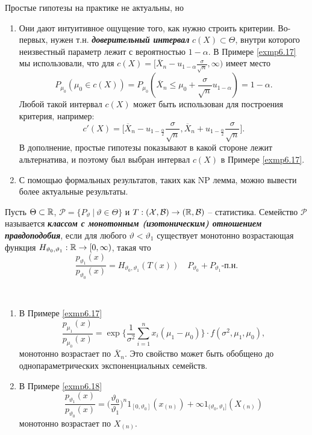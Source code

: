 \begin{rmrk}
	Простые гипотезы на практике не актуальны, но
	\begin{enumerate}
		\item Они дают интуитивное ощущение того, как нужно строить критерии. Во-первых, нужен т.н. \textbf{\textit{доверительный интервал}} $c(X) \subset \Theta$, внутри которого неизвестный параметр лежит с вероятностью $1-\alpha$. В Примере \ref{exmp6.17} мы использовали, что для $c(X)=[\overline{X}_n -u_{1 - \alpha} \frac{\sigma}{\sqrt{n}}, \infty)$ имеет место
		\[P_{\mu_0}(\mu_0 \in c(X)) = P_{\mu_0}(\overline{X}_n \leq \mu_0 + \frac{\sigma}{\sqrt{n}} u_{1-\alpha}) = 1-\alpha. \]
		Любой такой интервал  $c(X)$ может быть использован для построения критерия, например:
		\[c'(X) =\Big[\overline{X}_n -u_{1-\frac{\alpha}{2}} \frac{\sigma}{\sqrt{n}}, \overline{X}_n + u_{1-\frac{\alpha}{2}} \frac{\sigma}{\sqrt{n}} \Big].\]
		В дополнение, простые гипотезы показывают в какой стороне лежит альтернатива, и поэтому был выбран интервал $c(X)$ в Примере \ref{exmp6.17}.
		\item С помощью формальных результатов, таких как NP лемма, можно вывести более актуальные результаты.
	\end{enumerate}
\end{rmrk}

\begin{defn}
	Пусть $\Theta \subset \mathbb{R}$, $\mathcal{P} = \{P_\vartheta\ |\ \vartheta \in \Theta \}$ и $T:(\mathcal{X},\mathcal{B}) \rightarrow (\mathbb{R},\mathcal{B})$ -- статистика. Семейство $\mathcal{P}$ называется \textbf{\textit{классом с монотонным (изотоническим) отношением правдоподобия}}, если для любого $\vartheta < \vartheta_1$ существует монотонно возрастающая функция $H_{\vartheta_0, \vartheta_1}: \mathbb{R} \rightarrow [0, \infty)$, такая что
	\[\frac{p_{\vartheta_1}(x)}{p_{\vartheta_0}(x)} =H_{\vartheta_0, \vartheta_1}(T(x)) \quad P_{\vartheta_0} + P_{\vartheta_1}\text{-п.н.} \]
\end{defn}

\begin{exmp} \
	\begin{enumerate}
		\item В Примере \ref{exmp6.17}
		\[ \frac{p_{\mu_1}(x)}{p_{\mu_0}(x)} = \exp \Big \{ \frac{1}{\sigma^2} \sum_{i=1}^{n} x_i(\mu_1 - \mu_0) \Big \} \cdot f(\sigma^2, \mu_1, \mu_0),  \]
		монотонно возрастает по $\overline{X}_n$. Это свойство может быть обобщено до однопараметрических экспоненциальных семейств.
		\item В Примере \ref{exmp6.18}
		\[ \frac{p_{\vartheta_1}(x)}{p_{\vartheta_0}(x)} = \Big( \frac{\vartheta_0}{\vartheta_1} \Big)^n 1_{[0, \vartheta_0]}(x_{(n)}) + \infty 1_{(\vartheta_0, \vartheta_1]}(X_{(n)}) \]
		монотонно возрастает по $X_({n})$.
	\end{enumerate}
\end{exmp}

